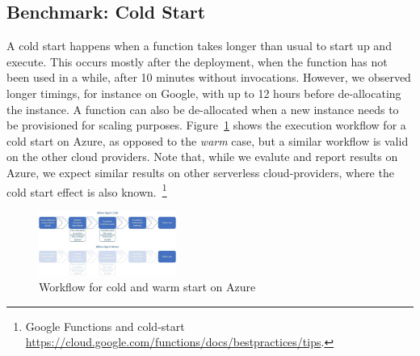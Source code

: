
\subsection{Benchmark: Cold Start}
\label{sec:coldstart}
A cold start happens when a function takes longer than usual to start up and execute. 
This occurs mostly after the deployment, when the function has not been used in a while, \eg after 10 minutes without invocations.
However, we observed longer timings, for instance on Google, with up to 12 hours before de-allocating the instance.  
A function can also be de-allocated when a new instance needs to be provisioned for scaling purposes. 
Figure~\ref{fig:azure_coldstart} shows the execution workflow for a cold start on Azure, as opposed to the \emph{warm} case, but a similar workflow is valid on the other cloud providers.
Note that, while we evalute and report results on Azure, we expect similar results on other serverless cloud-providers, where the cold start effect is also known.~\footnote{Google Functions and cold-start \url{https://cloud.google.com/functions/docs/bestpractices/tips}.}

\begin{figure}[!t]
\centering
\includegraphics[width=0.4\textwidth]{bilder/azure-coldstart.jpeg}
\caption{Workflow for cold and warm start on Azure~\cite{AzureColdStart}}
\label{fig:azure_coldstart}
\end{figure}

